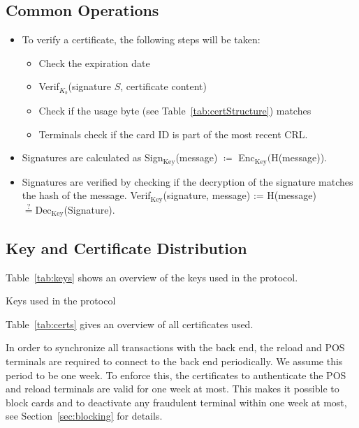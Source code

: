 \documentclass{article}
\begin{document}
\subsection{Common Operations}
\begin{itemize}
    \item To verify a certificate, the following steps will be taken:
        \begin{itemize}
            \item Check the expiration date
            \item Verif$_{K_b}$(signature $S$, certificate content)
            \item Check if the usage byte (see Table~\ref{tab:certStructure}) matches
            \item Terminals check if the card ID is part of the most recent CRL\@.
        \end{itemize}

    \item Signatures are calculated as Sign$_{\textrm{Key}}$(message) $\coloneqq$ \textrm{Enc}$_{\textrm{Key}}($H(message)).

    \item Signatures are verified by checking if the decryption of the signature matches the hash of the message.
    Verif$_{\textrm{Key}}$(signature, message) := H(message) $\stackrel{?}{=} \textrm{Dec}_{\textrm{Key}}$(Signature).
\end{itemize}

\subsection{Key and Certificate Distribution}

Table~\ref{tab:keys} shows an overview of the keys used in the protocol.
\begin{table}[ht]
    \centering
    
    \caption{Keys used in the protocol}
    \label{tab:keys}
\end{table}

Table~\ref{tab:certs} gives an overview of all certificates used.

In order to synchronize all transactions with the back end, the reload and POS terminals are required to connect to the back end periodically.
We assume this period to be one week.
To enforce this, the certificates to authenticate the POS and reload terminals are valid for one week at most.
This makes it possible to block cards and to deactivate any fraudulent terminal within one week at most, see Section~\ref{sec:blocking} for details.
\end{document}
